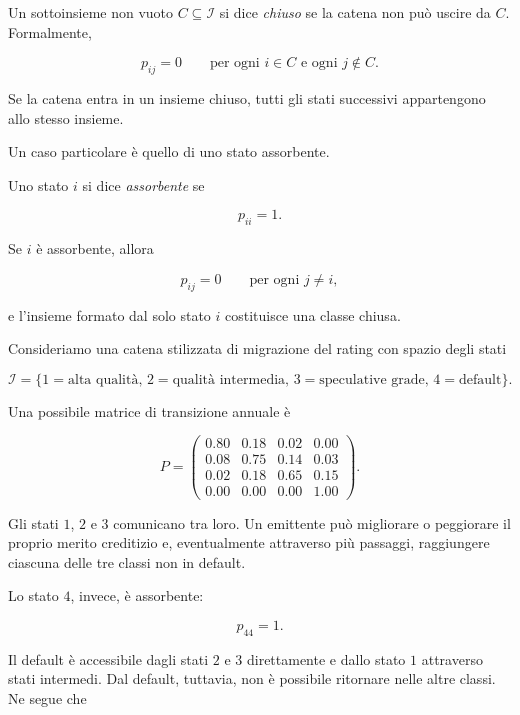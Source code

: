 \begin{definition}
Un sottoinsieme non vuoto \(C\subseteq\mathcal{I}\) si dice
\emph{chiuso} se la catena non pu\`{o} uscire da \(C\). Formalmente,

\[
p_{ij}=0
\qquad
\text{per ogni }i\in C
\text{ e ogni }j\notin C.
\]
\end{definition}

Se la catena entra in un insieme chiuso, tutti gli stati successivi
appartengono allo stesso insieme.

Un caso particolare \`{e} quello di uno stato assorbente.

\begin{definition}
Uno stato \(i\) si dice \emph{assorbente} se

\[
p_{ii}=1.
\]
\end{definition}

Se \(i\) \`{e} assorbente, allora

\[
p_{ij}=0
\qquad
\text{per ogni }j\neq i,
\]

e l'insieme formato dal solo stato \(i\) costituisce una classe chiusa.

Consideriamo una catena stilizzata di migrazione del rating con spazio
degli stati

\[
\mathcal{I}
=
\{
1=\text{alta qualit\`{a}},
\,
2=\text{qualit\`{a} intermedia},
\,
3=\text{speculative grade},
\,
4=\text{default}
\}.
\]

Una possibile matrice di transizione annuale \`{e}

\[
P=
\begin{pmatrix}
0.80 & 0.18 & 0.02 & 0.00\\
0.08 & 0.75 & 0.14 & 0.03\\
0.02 & 0.18 & 0.65 & 0.15\\
0.00 & 0.00 & 0.00 & 1.00
\end{pmatrix}.
\]

Gli stati \(1\), \(2\) e \(3\) comunicano tra loro. Un emittente pu\`{o}
migliorare o peggiorare il proprio merito creditizio e, eventualmente
attraverso pi\`{u} passaggi, raggiungere ciascuna delle tre classi non
in default.

Lo stato \(4\), invece, \`{e} assorbente:

\[
p_{44}=1.
\]

Il default \`{e} accessibile dagli stati \(2\) e \(3\) direttamente e
dallo stato \(1\) attraverso stati intermedi. Dal default, tuttavia, non
\`{e} possibile ritornare nelle altre classi. Ne segue che

